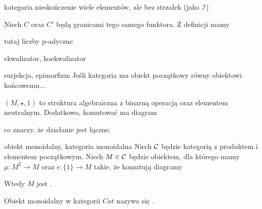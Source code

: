 kategoria nieskończenie wiele elementów, ale bez strzałek (jako $\mathcal{I}$)
 

Niech $C$ oraz $C'$ będą granicami tego samego funktora. Z definicji mamy
\begin{center}
\end{center}

tutaj liczby p-adyczne

ekwalizator, koekwalizator

\begin{definition}{surjekcja, epimorfizm}{}
  Jeśli kategoria ma obiekt początkowy równy obiektowi końcowemu...
\end{definition}

 $(M, \star, 1)$ to struktura algebraiczna z binarną operacją oraz elementem neutralnym. Dodatkowo, komutować ma diagram 
\begin{center}
\end{center}
co znaczy, że działanie jest łączne.

\begin{definition}{obiekt monoidalny, kategoria monoidalna}{}
  Niech $\mathcal{C}$ będzie kategorią z produktem i elementem początkowym. Niech $M\in \mathcal{C}$ będzie obiektem, dla którego mamy $\mu:M^2\to M$ oraz $\epsilon: \{1\}\to M$ takie, że komutują diagramy
  \begin{center}
  \end{center}
  \begin{center}
  \end{center}
  Wtedy $M$ jest .
  
  Obiekt monoidalny w kategorii $Cat$ nazywa się .
\end{definition}

